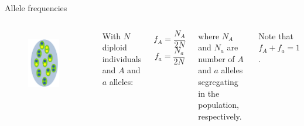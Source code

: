 \begin{frame}{Allele frequencies}

	\begin{columns}


                \begin{figure}
                        \includegraphics[width=0.8\textwidth]{Pics/population} \
                \end{figure}


		With $N$ diploid individuals and $A$ and $a$ alleles:

		\begin{equation}
			f_A = \frac{N_A}{2N}
		\end{equation}
		\begin{equation}
			f_a = \frac{N_a}{2N}
		\end{equation}

		where $N_A$ and $N_a$ are number of $A$ and $a$ alleles segregating in the 
		population, respectively.

		\bigskip

		Note that $f_A + f_a = 1$.

        \end{columns}

\end{frame}


